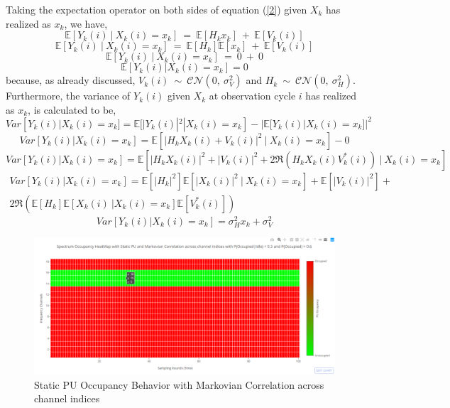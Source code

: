 \documentclass[12pt, draftcls, onecolumn]{IEEEtran}
\begin{document}
Taking the expectation operator on both sides of equation (\ref{2}) given $X_k$ has realized as $x_k$, we have,
\[\mathbb E[Y_k(i)\ |\ X_k(i)=x_k]\ =\ \mathbb E[H_kx_k]\ +\ \mathbb E[V_k(i)]\]
\[\mathbb E[Y_k(i)\ |\ X_k(i)=x_k]\ =\ \mathbb E[H_k]\mathbb E[x_k]\ +\ \mathbb E[V_k(i)]\]
\[\mathbb E[Y_k(i)\ |\ X_k(i)=x_k]\ =\ 0\ +\ 0\]
\begin{equation}\label{5}
    \mathbb E[Y_k(i) | X_k(i) = x_k] = 0
\end{equation}
because, as already discussed, $V_k(i)\ \sim\ \mathcal{CN}(0,\ \sigma_V^2)$ and $H_k\ \sim\ \mathcal{CN}(0,\ \sigma_H^2)$.
\\Furthermore, the variance of $Y_k(i)$ given $X_k$ at observation cycle $i$ has realized as $x_k$, is calculated to be, 
\begin{equation*}
    Var[Y_k(i) | X_k(i) = x_k] = \mathbb E[|Y_k(i)|^2 | X_k(i) = x_k] - |\mathbb E[Y_k(i) | X_k(i) = x_k]|^2
\end{equation*}
\begin{equation*}
    Var[Y_k(i) | X_k(i) = x_k] = \mathbb E[|H_kX_k(i)+V_k(i)|^2\ |\ X_k(i) = x_k] - 0
\end{equation*}
\begin{equation*}
    Var[Y_k(i) | X_k(i) = x_k] = \mathbb E[|H_kX_k(i)|^2 + |V_k(i)|^2 + 2\Re(H_kX_k(i)V_k^*(i))\ |\ X_k(i)=x_k]
\end{equation*}
\begin{equation*}
    \begin{aligned}
        Var[Y_k(i) | X_k(i) = x_k] = \mathbb E[|H_k|^2]\mathbb E[|X_k(i)|^2\ |\ X_k(i)=x_k] + \mathbb E[|V_k(i)|^2] + \\2\Re(\mathbb E[H_k]\mathbb E[X_k(i)\ | X_k(i)=x_k]\mathbb E[V_k^*(i)])
    \end{aligned}
\end{equation*}
\begin{equation}\label{6}
    Var[Y_k(i) | X_k(i) = x_k] = \sigma_H^2x_k + \sigma_V^2
\end{equation}
\begin{figure}[t]
\includegraphics[width=1.0\textwidth]{Spectrum_Occupancy_Spatial_Markovian_Correlation.png}
\caption{Static PU Occupancy Behavior with Markovian Correlation across channel indices}
\label{fig:mesh1}
\centering
\end{figure}
\end{document}
